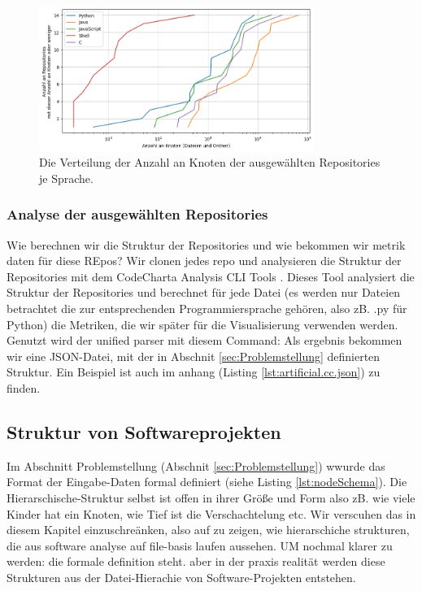 \begin{figure}
    \centering
    \includegraphics[width=0.8\textwidth]{images/datenanalyse/repoAnzahlNodesVerteilung.png}
    \caption{Die Verteilung der Anzahl an Knoten der ausgewählten Repositories je Sprache.}
    \label{fig:repoAnzahlNodesVerteilung}
\end{figure}

\subsubsection{Analyse der ausgewählten Repositories} \label{sec:analyseDerAusgewähltenRepositories}
Wie berechnen wir die Struktur der Repositories und wie bekommen wir metrik daten für diese REpos?
Wir clonen jedes repo und analysieren die Struktur der Repositories mit dem CodeCharta Analysis CLI Tools \cite{code_charta_wiki_ana}. Dieses Tool analysiert die Struktur der Repositories und berechnet für jede Datei (es werden nur Dateien betrachtet die zur entsprechenden Programmiersprache gehören, also zB. .py für Python) die Metriken, die wir später für die Visualisierung verwenden werden. Genutzt wird der unified parser mit diesem Command:
Als ergebnis bekommen wir eine JSON-Datei, mit der in Abschnit \ref{sec:Problemstellung} definierten Struktur. Ein Beispiel ist auch im anhang (Listing \ref{lst:artificial.cc.json}) zu finden.

\subsection{Struktur von Softwareprojekten} \label{sec:strukturVonSoftwareprojekten}    

Im Abschnitt Problemstellung (Abschnit \ref{sec:Problemstellung}) wwurde das Format der Eingabe-Daten formal definiert (siehe Listing \ref{lst:nodeSchema}). Die Hierarschische-Struktur selbst ist offen in ihrer Größe und Form also zB. wie viele Kinder hat ein Knoten, wie Tief ist die Verschachtelung etc. Wir verscuhen das in diesem Kapitel einzuschreänken, also auf zu zeigen, wie hierarschiche strukturen, die aus software analyse auf file-basis laufen aussehen. UM nochmal klarer zu werden: die formale definition steht. aber in der praxis realität werden diese Strukturen aus der Datei-Hierachie von Software-Projekten entstehen. 

